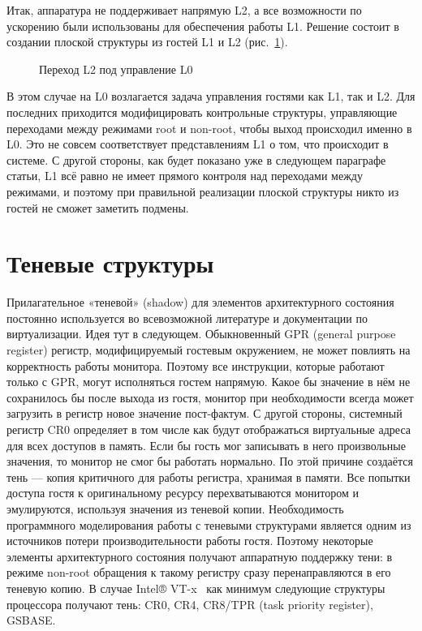 Итак, аппаратура не поддерживает напрямую L2, а все возможности по ускорению были использованы для обеспечения работы L1. Решение состоит в создании плоской структуры из гостей L1 и L2 (рис.~\ref{fig:nested-virt-flat}). 

\begin{figure}[htb]
    \centering
    \caption[Переход L2 под управление L0]{Переход L2 под управление L0}
    \label{fig:nested-virt-flat}
\end{figure}

В этом случае на L0 возлагается задача управления гостями как L1, так и L2. Для последних приходится модифицировать контрольные структуры, управляющие переходами между режимами root и non-root, чтобы выход происходил именно в L0. Это не совсем соответствует представлениям L1 о том, что происходит в системе. С другой стороны, как будет показано уже в следующем параграфе статьи, L1 всё равно не имеет прямого контроля над переходами между режимами, и поэтому при правильной реализации плоской структуры никто из гостей не сможет заметить подмены.

\section{Теневые структуры}

Прилагательное «теневой» (\abbr shadow) для элементов архитектурного состояния постоянно используется во всевозможной литературе и документации по виртуализации. Идея тут в следующем. Обыкновенный GPR (\abbr general purpose register) регистр, модифицируемый гостевым окружением, не может повлиять на корректность работы монитора. Поэтому все инструкции, которые работают только с GPR, могут исполняться гостем напрямую. Какое бы значение в нём не сохранилось бы после выхода из гостя, монитор при необходимости всегда может загрузить в регистр новое значение пост-фактум. С другой стороны, системный регистр CR0 определяет в том числе как будут отображаться виртуальные адреса для всех доступов в память. Если бы гость мог записывать в него произвольные значения, то монитор не смог бы работать нормально. По этой причине создаётся тень — копия критичного для работы регистра, хранимая в памяти. Все попытки доступа гостя к оригинальному ресурсу перехватываются монитором и эмулируются, используя значения из теневой копии.
Необходимость программного моделирования работы с теневыми структурами является одним из источников потери производительности работы гостя. Поэтому некоторые элементы архитектурного состояния получают аппаратную поддержку тени: в режиме non-root обращения к такому регистру сразу перенаправляются в его теневую копию.
В случае Intel® VT-x  как минимум следующие структуры процессора получают тень: CR0, CR4, CR8/TPR (\abbr task priority register), GSBASE.

